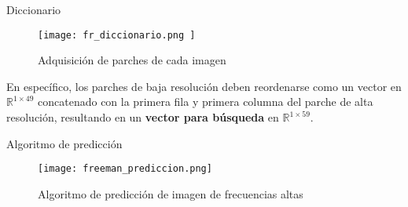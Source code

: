 \begin{frame}{Diccionario}

    \begin{figure}[H]
        \texttt{[image:  fr\_diccionario.png ]}
        \centering
        \caption{ Adquisición de parches de cada imagen}
        \label{fig:fr_dic}
    \end{figure}

    En específico, los parches de baja resolución deben reordenarse como un vector 
    en $\mathbb{R}^{1\times49}$ concatenado con la primera fila y primera columna
    del parche de alta resolución, resultando en un \textbf{vector para búsqueda} en $\mathbb{R}^{1\times59}$.
    
\end{frame}


\begin{frame}{Algoritmo de predicción}

    \begin{figure}[H]
        \texttt{[image:  freeman\_prediccion.png]}
        \centering
        \caption{ Algoritmo de predicción de imagen de frecuencias altas }
        \label{fig:fr_prediccion}
    \end{figure}

\end{frame}
